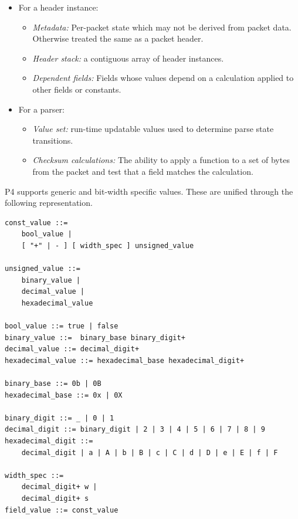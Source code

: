 \documentclass[12pt]{article}
\begin{document}
\begin{itemize}

\item
For a header instance:
\begin{itemize}
\item
\textit{Metadata:} Per-packet state which may not be derived from
packet data. Otherwise treated the same as a packet header.
\item
\textit{Header stack:} a contiguous array of header instances.
\item
\textit{Dependent fields:} Fields whose values depend on a calculation
applied to other fields or constants.
\end{itemize}

\item
For a parser:
\begin{itemize}
\item
\textit{Value set:} run-time updatable values used to determine parse
state transitions.
\item
\textit{Checksum calculations:} The ability to apply a function to a
set of bytes from the packet and test that a field matches the
calculation.
\end{itemize}

\end{itemize}



P4 supports generic and bit-width specific values. These are unified through
the following representation.

\begin{lstlisting}[style=BNFstyle]
const_value ::=
    bool_value |
    [ "+" | - ] [ width_spec ] unsigned_value

unsigned_value ::= 
    binary_value | 
    decimal_value | 
    hexadecimal_value

bool_value ::= true | false
binary_value ::=  binary_base binary_digit+
decimal_value ::= decimal_digit+
hexadecimal_value ::= hexadecimal_base hexadecimal_digit+

binary_base ::= 0b | 0B
hexadecimal_base ::= 0x | 0X

binary_digit ::= _ | 0 | 1
decimal_digit ::= binary_digit | 2 | 3 | 4 | 5 | 6 | 7 | 8 | 9
hexadecimal_digit ::= 
    decimal_digit | a | A | b | B | c | C | d | D | e | E | f | F

width_spec ::=
    decimal_digit+ w |
    decimal_digit+ s
field_value ::= const_value
\end{lstlisting}
\end{document}
